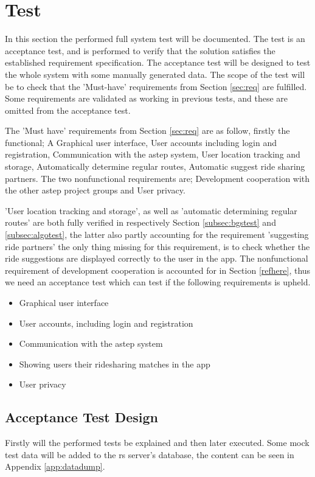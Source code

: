 \section{Test}
In this section the performed full system test will be documented.
The test is an acceptance test, and is performed to verify that the solution satisfies the established requirement specification.
The acceptance test will be designed to test the whole system with some manually generated data.
The scope of the test will be to check that the 'Must-have' requirements from Section \ref{sec:req} are fulfilled.
Some requirements are validated as working in previous tests, and these are omitted from the acceptance test. 

The 'Must have' requirements from Section \ref{sec:req} are as follow, firstly the functional; A Graphical user interface, User accounts including login and registration, Communication with the \gls{astep} system, User location tracking and storage, Automatically determine regular routes, Automatic suggest ride sharing partners. The two nonfunctional requirements are; Development cooperation with the other \gls{astep} project groups and User privacy.

'User location tracking and storage', as well as 'automatic determining regular routes' are both fully verified in respectively Section \ref{subsec:bgstest} and \ref{subsec:algotest}, the latter also partly accounting for the requirement 'suggesting ride partners' the only thing missing for this requirement, is to check whether the ride suggestions are displayed correctly to the user in the app. 
The nonfunctional requirement of development cooperation is accounted for in Section \ref{refhere}, thus we need an acceptance test which can test if the following requirements is upheld. 
\begin{itemize}
	\item Graphical user interface
	\item User accounts, including login and registration
	\item Communication with the \gls{astep} system
	\item Showing users their ridesharing matches in the app
	\item User privacy
\end{itemize}

\subsection{Acceptance Test Design}
Firstly will the performed tests be explained and then later executed.
Some mock test data will be added to the \gls{rs} server's database, the content can be seen in Appendix \ref{app:datadump}.

